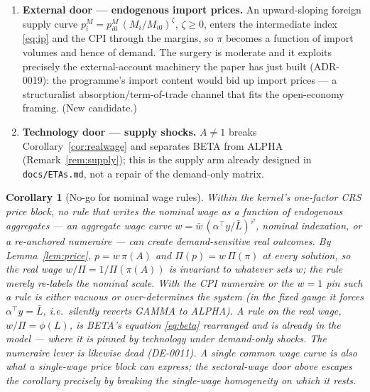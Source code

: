 \documentclass[11pt]{article}
\newtheorem{corollary}{Corollary}
\numberwithin{equation}{section}
\newcommand{\Lbar}{\bar{L}}
\begin{document}
\begin{enumerate}
      sector-fixed factor with a rental schedule makes marginal cost rise
      in $y_i$ (rents require a rental-income closure --- the largest
      surgery, candidate 3 in \texttt{docs/ETAs.md}). The reduced-form
      variant avoids all income-closure problems: an endogenous utilization
      externality $A^{eff}_i = A_i\,(y_i/\lambda_i)^{-\delta}$ raises unit
      cost with demand while keeping zero profit (the extra cost is paid to
      no one), so a one-line change in the cost hook \eqref{eq:cost}
      suffices. With the opposite sign ($\delta < 0$) it is the
      Kaldor--Verdoorn case: increasing returns make prices \emph{fall}
      with demand --- heterodox-friendly variety in the other direction.
      (New candidate; see Section~\ref{sec:conclusion}.)
\item \textbf{External door --- endogenous import prices.} An
      upward-sloping foreign supply curve
      $p^M_i = p^M_{i0}\,(M_i/M_{i0})^{\zeta}$, $\zeta \geq 0$, enters the
      intermediate index \eqref{eq:ip} and the CPI through the margins, so
      $\pi$ becomes a function of import volumes and hence of demand. The
      surgery is moderate and it exploits precisely the external-account
      machinery the paper has just built (ADR-0019): the programme's import
      content would bid up import prices --- a structuralist
      absorption/term-of-trade channel that fits the open-economy framing.
      (New candidate.)
\item \textbf{Technology door --- supply shocks.} $A \neq 1$ breaks
      Corollary~\ref{cor:realwage} and separates BETA from ALPHA
      (Remark~\ref{rem:supply}); this is the supply arm already designed in
      \texttt{docs/ETAs.md}, not a repair of the demand-only matrix.
\end{enumerate}

\begin{corollary}[No-go for nominal wage rules]\label{cor:nogo}
Within the kernel's one-factor CRS price block, no rule that writes the
\emph{nominal} wage as a function of endogenous aggregates --- an aggregate
wage curve $w = \bar{w}\,(\alpha^{\!\top}y/\Lbar)^{\varphi}$, nominal
indexation, or a re-anchored numeraire --- can create demand-sensitive
\emph{real} outcomes. By Lemma~\ref{lem:price}, $p = w\,\pi(A)$ and
$\Pi(p) = w\,\Pi(\pi)$ at every solution, so the real wage
$w/\Pi = 1/\Pi(\pi(A))$ is invariant to whatever sets $w$; the rule merely
re-labels the nominal scale. With the CPI numeraire or the $w = 1$ pin such
a rule is either vacuous or over-determines the system (in the fixed gauge
it forces $\alpha^{\!\top}y = \Lbar$, i.e.\ silently reverts GAMMA to
ALPHA). A rule on the \emph{real} wage, $w/\Pi = \phi(L)$, is BETA's
equation \eqref{eq:beta} rearranged and is already in the model --- where
it is pinned by technology under demand-only shocks. The numeraire lever is
likewise dead (DE-0011).
\textcolor{revisionV1}{A single common wage curve is also what a
\emph{single-wage} price block can express; the sectoral-wage door above
escapes the corollary precisely by breaking the single-wage homogeneity on
which it rests.}
\end{corollary}
\end{document}
